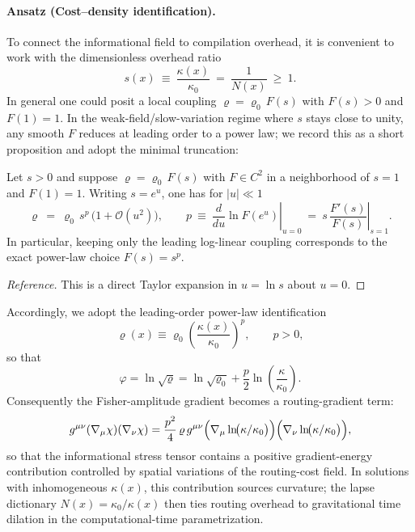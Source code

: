 \paragraph{Ansatz (Cost--density identification).}
To connect the informational field to compilation overhead, it is convenient to work with the dimensionless overhead ratio
\begin{equation}
    s(x)\ \equiv\ \frac{\kappa(x)}{\kappa_0}\ =\ \frac{1}{N(x)}\ \ge\ 1.
\end{equation}
In general one could posit a local coupling $\varrho=\varrho_0\,F(s)$ with $F(s)>0$ and $F(1)=1$. In the weak-field/slow-variation regime where $s$ stays close to unity, any smooth $F$ reduces at leading order to a power law; we record this as a short proposition and adopt the minimal truncation:
\begin{proposition}
\label{prop:cost_density_powerlaw}
Let $s>0$ and suppose $\varrho=\varrho_0\,F(s)$ with $F\in C^2$ in a neighborhood of $s=1$ and $F(1)=1$. Writing $s=e^{u}$, one has for $|u|\ll 1$
\begin{equation}
    \varrho\ =\ \varrho_0\, s^{p}\,\bigl(1+\mathcal{O}(u^2)\bigr),\qquad
    p\ \equiv\ \left.\frac{d}{du}\ln F(e^{u})\right|_{u=0}
    \ =\ \left.s\,\frac{F'(s)}{F(s)}\right|_{s=1}.
\end{equation}
In particular, keeping only the leading log-linear coupling corresponds to the exact power-law choice $F(s)=s^{p}$.
\end{proposition}
\begin{proof}[Reference]
This is a direct Taylor expansion in $u=\ln s$ about $u=0$.
\end{proof}
\noindent
Accordingly, we adopt the leading-order power-law identification
\begin{equation}
    \varrho(x)\equiv \varrho_0\left(\frac{\kappa(x)}{\kappa_0}\right)^p,\qquad p>0,
\end{equation}
so that
\begin{equation}
    \varphi = \ln\sqrt{\varrho} = \ln\sqrt{\varrho_0} + \frac{p}{2}\ln\!\left(\frac{\kappa}{\kappa_0}\right).
\end{equation}
Consequently the Fisher-amplitude gradient becomes a routing-gradient term:
\begin{equation}
    g^{\mu\nu}(\nabla_\mu\chi)(\nabla_\nu\chi)
    = \frac{p^2}{4}\,\varrho\,g^{\mu\nu}\Bigl(\nabla_\mu\ln\!\bigl(\kappa/\kappa_0\bigr)\Bigr)\Bigl(\nabla_\nu\ln\!\bigl(\kappa/\kappa_0\bigr)\Bigr),
\end{equation}
so that the informational stress tensor contains a positive gradient-energy contribution controlled by spatial variations of the routing-cost field. In solutions with inhomogeneous $\kappa(x)$, this contribution sources curvature; the lapse dictionary $N(x)=\kappa_0/\kappa(x)$ then ties routing overhead to gravitational time dilation in the computational-time parametrization.


